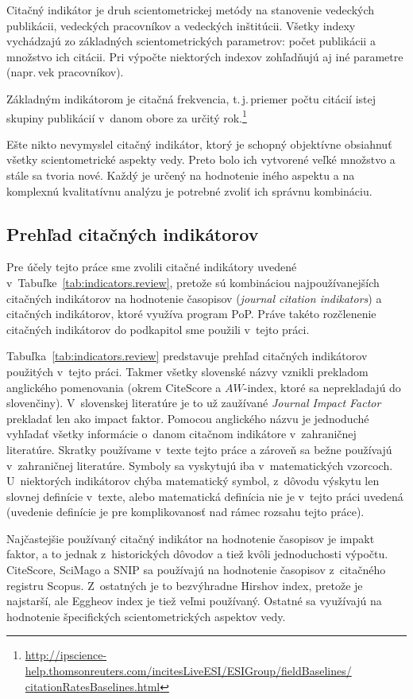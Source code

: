 Citačný indikátor je druh scientometrickej metódy na stanovenie 
vedeckých publikácii, vedeckých pracovníkov a vedeckých inštitúcii.  Všetky
indexy vychádzajú zo základných scientometrických parametrov: počet publikácii a
množstvo ich citácii.  Pri výpočte niektorých indexov zohľadňujú aj iné
parametre (napr.\,vek pracovníkov).

Základným indikátorom je citačná frekvencia, t.\,j.\,priemer počtu citácií istej
skupiny publikácií v~danom obore za určitý
rok.\footnote{\url{http://ipscience-help.thomsonreuters.com/incitesLiveESI/ESIGroup/fieldBaselines/
    citationRatesBaselines.html}}

Ešte nikto nevymyslel citačný indikátor, ktorý je schopný objektívne obsiahnuť
všetky scientometrické aspekty vedy.  Preto bolo ich vytvorené veľké množstvo a
stále sa tvoria nové.  Každý je určený na hodnotenie iného aspektu a na
komplexnú kvalitatívnu analýzu je potrebné zvoliť ich správnu kombináciu.

\subsection{Prehľad citačných indikátorov}

Pre účely tejto práce sme zvolili citačné indikátory uvedené
v~Tabuľke~\ref{tab:indicators.review}, pretože sú kombináciou najpoužívanejších
citačných indikátorov na hodnotenie časopisov (\emph{journal citation
  indikators}) a citačných indikátorov, ktoré využíva program PoP.  Práve takéto rozčlenenie citačných indikátorov do podkapitol sme
použili v~tejto práci.

Tabuľka~\ref{tab:indicators.review} predstavuje prehľad citačných indikátorov
použitých v~tejto práci.  Takmer všetky slovenské názvy vznikli prekladom
anglického pomenovania (okrem CiteScore a $AW$-index, ktoré sa neprekladajú do
slovenčiny).  V~slovenskej literatúre je to už zaužívané \emph{Journal Impact
  Factor} prekladať len ako impact faktor.  Pomocou anglického názvu je
jednoduché vyhľadať všetky informácie o~danom citačnom indikátore v~zahraničnej
literatúre.  Skratky používame v~texte tejto práce a zároveň sa bežne používajú
v~zahraničnej literatúre.  Symboly sa vyskytujú iba v~matematických vzorcoch.
U~niektorých indikátorov chýba matematický symbol, z~dôvodu výskytu len slovnej
definície v~texte, alebo matematická definícia nie je v~tejto práci uvedená
(uvedenie definície je pre komplikovanosť nad rámec rozsahu tejto práce).

Najčastejšie používaný citačný indikátor na hodnotenie časopisov je impakt
faktor, a to jednak z~historických dôvodov a tiež kvôli jednoduchosti výpočtu.
CiteScore, SciMago a SNIP sa používajú na hodnotenie časopisov z~citačného
registru Scopus.  Z~ostatných je to bezvýhradne Hirshov index, pretože je
najstarší, ale Eggheov index je tiež veľmi používaný.  Ostatné sa využívajú na
hodnotenie špecifických scientometrických aspektov vedy.

